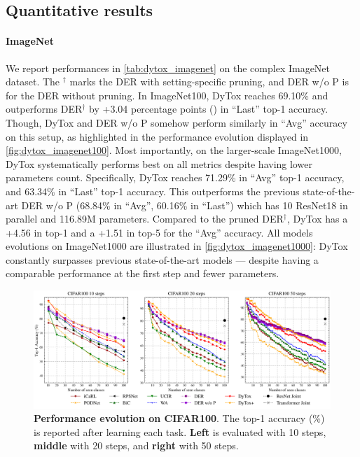 \subsection{Quantitative results}

\paragraph{ImageNet}
We report performances in \autoref{tab:dytox_imagenet} on the complex ImageNet dataset. The $^\dagger$
marks the DER with setting-specific pruning, and DER w/o P is for the DER without pruning. In
ImageNet100, DyTox reaches 69.10\% and outperforms DER$^\dagger$ by +3.04 percentage points (\pp) in
``Last'' top-1 accuracy. Though, DyTox and DER w/o P somehow perform similarly in ``Avg'' accuracy
on this setup, as highlighted in the performance evolution displayed in \autoref{fig:dytox_imagenet100}.
Most importantly, on the larger-scale ImageNet1000, DyTox systematically performs best on all
metrics despite having lower parameters count. Specifically, DyTox reaches 71.29\% in ``Avg'' top-1
accuracy, and 63.34\% in ``Last'' top-1 accuracy. This outperforms the previous state-of-the-art DER
w/o P (68.84\% in ``Avg'', 60.16\% in ``Last'') which has 10 ResNet18 in parallel and 116.89M
parameters. Compared to the pruned DER$^\dagger$, DyTox has a +4.56 \pp in top-1 and a +1.51 \pp in
top-5 for the ``Avg'' accuracy. All models evolutions on ImageNet1000 are illustrated in
\autoref{fig:dytox_imagenet1000}: DyTox constantly surpasses previous state-of-the-art models --- despite
having a comparable performance at the first step and fewer parameters.



\begin{figure}[t!]
    \centering
    \includegraphics[width=0.9\linewidth]{images/dytox/cifar.png}
    \caption{\textbf{Performance evolution on CIFAR100}. The top-1 accuracy (\%) is reported after
        learning each task. \textbf{Left} is evaluated with 10 steps, \textbf{middle} with 20 steps, and
        \textbf{right} with 50 steps.}
    \label{fig:dytox_increment_cifar}
\end{figure}

